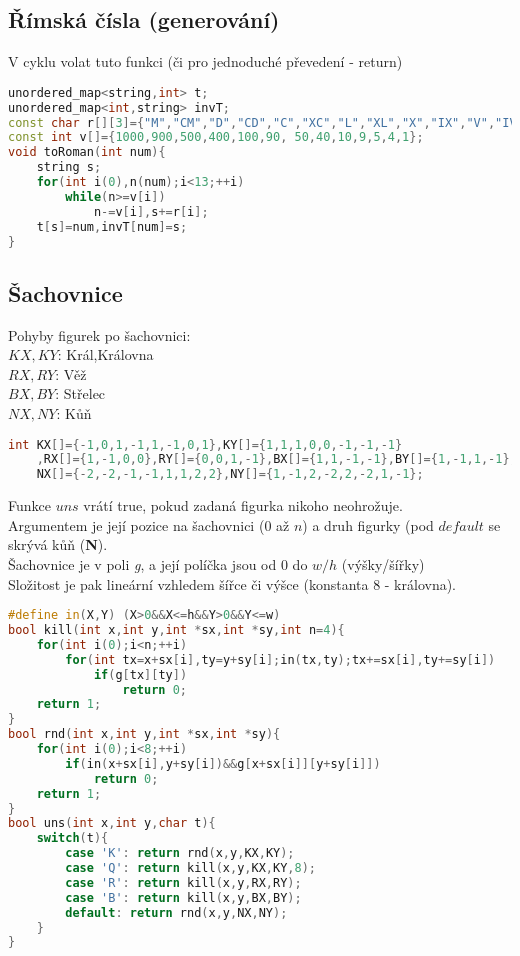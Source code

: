 \documentclass[11pt]{article}
\begin{document}
\subsection{Římská čísla (generování)}
V cyklu volat tuto funkci (či pro jednoduché převedení - return)
\begin{lstlisting}[language=C++]
unordered_map<string,int> t;
unordered_map<int,string> invT;
const char r[][3]={"M","CM","D","CD","C","XC","L","XL","X","IX","V","IV","I"};
const int v[]={1000,900,500,400,100,90, 50,40,10,9,5,4,1};
void toRoman(int num){
    string s;
    for(int i(0),n(num);i<13;++i)
        while(n>=v[i])
            n-=v[i],s+=r[i];
    t[s]=num,invT[num]=s;
}
\end{lstlisting}
\subsection{Šachovnice}
Pohyby figurek po šachovnici:
\\$KX,KY$: Král,Královna
\\$RX,RY$: Věž
\\$BX,BY$: Střelec
\\$NX,NY$: Kůň
\begin{lstlisting}[language=C++]
int KX[]={-1,0,1,-1,1,-1,0,1},KY[]={1,1,1,0,0,-1,-1,-1}
    ,RX[]={1,-1,0,0},RY[]={0,0,1,-1},BX[]={1,1,-1,-1},BY[]={1,-1,1,-1},
    NX[]={-2,-2,-1,-1,1,1,2,2},NY[]={1,-1,2,-2,2,-2,1,-1};
\end{lstlisting}
Funkce $uns$ vrátí true, pokud zadaná figurka nikoho neohrožuje.
\\Argumentem je její pozice na šachovnici ($0$ až $n$) a druh figurky (pod $default$ se skrývá kůň (\textbf{N}).
\\Šachovnice je v poli \textsl{g}, a její políčka jsou od $0$ do $w/h$ (výšky/šířky)
\\Složitost je pak lineární vzhledem šířce či výšce (konstanta 8 - královna).
\begin{lstlisting}[language=C++]
#define in(X,Y) (X>0&&X<=h&&Y>0&&Y<=w)
bool kill(int x,int y,int *sx,int *sy,int n=4){
    for(int i(0);i<n;++i)
        for(int tx=x+sx[i],ty=y+sy[i];in(tx,ty);tx+=sx[i],ty+=sy[i])
            if(g[tx][ty])
                return 0;
    return 1;
}
bool rnd(int x,int y,int *sx,int *sy){
    for(int i(0);i<8;++i)
        if(in(x+sx[i],y+sy[i])&&g[x+sx[i]][y+sy[i]])
            return 0;
    return 1;
}
bool uns(int x,int y,char t){
    switch(t){
        case 'K': return rnd(x,y,KX,KY);
        case 'Q': return kill(x,y,KX,KY,8);
        case 'R': return kill(x,y,RX,RY);
        case 'B': return kill(x,y,BX,BY);
        default: return rnd(x,y,NX,NY);
    }
}
\end{lstlisting}
\end{document}
